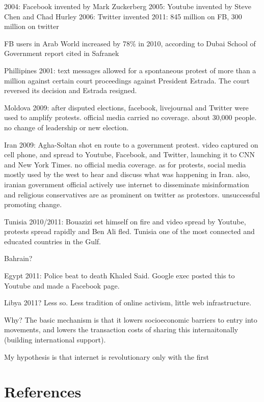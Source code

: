 \documentclass[12pt,book]{article}
\begin{document}
2004: Facebook invented by Mark Zuckerberg 2005: Youtube invented by
Steve Chen and Chad Hurley 2006: Twitter invented 2011: 845 million on
FB, 300 million on twitter

FB users in Arab World increased by 78\% in 2010, according to Dubai
School of Government report cited in Safranek

Phillipines 2001: text messages allowed for a spontaneous protest of
more than a million against certain court proceedings against President
Estrada. The court reversed its decision and Estrada resigned.

Moldova 2009: after disputed elections, facebook, livejournal and
Twitter were used to amplify protests. official media carried no
coverage. about 30,000 people. no change of leadership or new election.

Iran 2009: Agha-Soltan shot en route to a government protest. video
captured on cell phone, and spread to Youtube, Facebook, and Twitter,
launching it to CNN and New York Times. no official media coverage. as
for protests, social media mostly used by the west to hear and discuss
what was happening in Iran. also, iranian government official actively
use internet to disseminate misinformation and religious conservatives
are as prominent on twitter as protestors. unsuccessful promoting
change.

Tunisia 2010/2011: Bouazizi set himself on fire and video spread by
Youtube, protests spread rapidly and Ben Ali fled. Tunisia one of the
most connected and educated countries in the Gulf.

Bahrain?

Egypt 2011: Police beat to death Khaled Said. Google exec posted this to
Youtube and made a Facebook page.

Libya 2011? Less so. Less tradition of online activism, little web
infrastructure.

Why? The basic mechanism is that it lowers socioeconomic barriers to
entry into movements, and lowers the transaction costs of sharing this
internaitonally (building international support).

My hypothesis is that internet is revolutionary only with the first

\pagebreak

\section*{References}\label{references}
\end{document}
